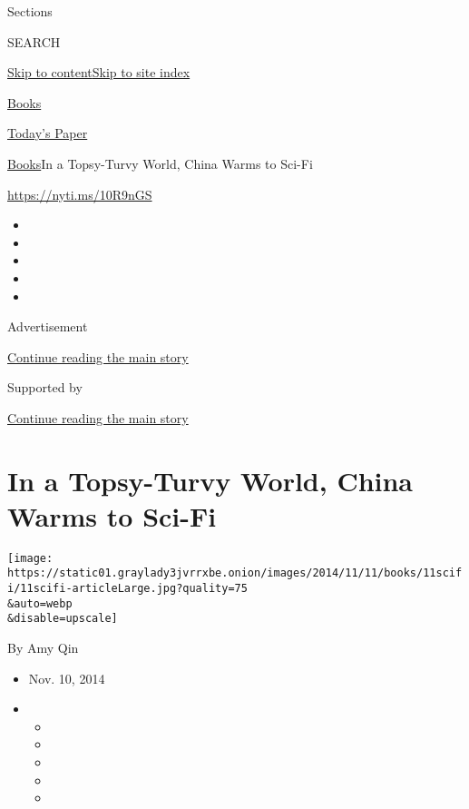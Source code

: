Sections

SEARCH

\protect\hyperlink{site-content}{Skip to
content}\protect\hyperlink{site-index}{Skip to site index}

\href{https://www.nytimes3xbfgragh.onion/section/books}{Books}

\href{https://myaccount.nytimes3xbfgragh.onion/auth/login?response_type=cookie\&client_id=vi}{}

\href{https://www.nytimes3xbfgragh.onion/section/todayspaper}{Today's
Paper}

\href{/section/books}{Books}\textbar{}In a Topsy-Turvy World, China
Warms to Sci-Fi

\url{https://nyti.ms/10R9nGS}

\begin{itemize}
\item
\item
\item
\item
\item
\end{itemize}

Advertisement

\protect\hyperlink{after-top}{Continue reading the main story}

Supported by

\protect\hyperlink{after-sponsor}{Continue reading the main story}

\hypertarget{in-a-topsy-turvy-world-china-warms-to-sci-fi}{%
\section{In a Topsy-Turvy World, China Warms to
Sci-Fi}\label{in-a-topsy-turvy-world-china-warms-to-sci-fi}}

\texttt{[image: https://static01.graylady3jvrrxbe.onion/images/2014/11/11/books/11scifi/11scifi-articleLarge.jpg?quality=75\\\&auto=webp\\\&disable=upscale]}

By Amy Qin

\begin{itemize}
\item
  Nov. 10, 2014
\item
  \begin{itemize}
  \item
  \item
  \item
  \item
  \item
  \end{itemize}
\end{itemize}

